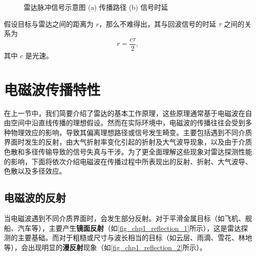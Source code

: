 \begin{figure}[htb!]
\begin{subfigure}{.8\textwidth}
        \caption{}
        \label{fig_chp1_radar_pulse_2}
    \end{subfigure}
    \caption{雷达脉冲信号示意图 (a) 传播路径 (b) 信号时延}
    \label{fig_chp1_radar_pulse}
\end{figure}

假设目标与雷达之间的距离为 $r$，那么不难得出，其与回波信号的时延 $\tau$ 之间的关系为
\begin{equation}
    r = \frac{c \tau}{2},
    \label{eq:radar_time_delay}
\end{equation}
其中 $c$ 是光速。

\section{电磁波传播特性}

在上一节中，我们简要介绍了雷达的基本工作原理，这些原理通常基于电磁波在自由空间中沿直线传播的理想假设。然而在实际环境中，电磁波的传播往往会受到多种物理效应的影响，导致其偏离理想路径或信号发生畸变。主要包括遇到不同介质界面时发生的反射，由大气折射率变化引起的折射及大气波导现象，以及由于介质色散和多径传输导致的信号失真与干涉。为了更全面理解这些现象对雷达探测性能的影响，下面将依次介绍电磁波在传播过程中所表现出的反射、折射、大气波导、色散以及多径效应。

\subsection{电磁波的反射}

当电磁波遇到不同介质界面时，会发生部分反射。对于平滑金属目标（如飞机、舰船、汽车等），主要产生\textbf{镜面反射}（如\cref{fig_chp1_reflection_1}所示），这是雷达探测的主要基础。而对于粗糙或尺寸与波长相当的目标（如云层、雨滴、雪花、林地等），会出现明显的\textbf{漫反射}现象（如\cref{fig_chp1_reflection_2}所示）。

